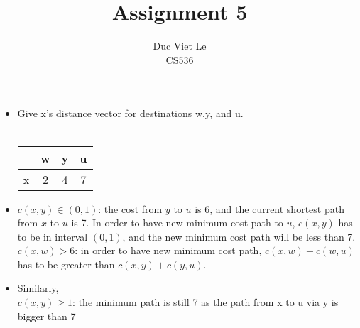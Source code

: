 \documentclass[11pt]{article}
\newenvironment{problem}[2][Problem]{\begin{trivlist}
\item[\hskip \labelsep {\bfseries #1}\hskip \labelsep {\bfseries #2.}]}{\end{trivlist}}
\begin{document}
\title{Assignment 5}
\author{Duc Viet Le\\ CS536}
 
\maketitle

\begin{problem}{1}
\end{problem}

\begin{problem}{2}
\end{problem}
\begin{itemize}
	\item Give x's distance vector for destinations w,y, and u.
	\\\\
	\begin{tabular}{c c c c}
		\hline & w & y & u \\
		\hline x &2 & 4 & 7
	\end{tabular}
	\item 
	$c(x,y) \in (0,1)$: the cost from $y$ to $u$ is 6, and the current shortest path from $x$ to $u$ is 7. In order to have new minimum cost path to $u$, $c(x,y)$ has to be in interval $(0,1)$, and the new minimum cost path will be less than 7.
	\\
	$c(x,w) > 6$: in order to have new minimum cost path, $c(x,w)+c(w,u)$ has to be greater than $c(x,y)+c(y,u)$.
	\item Similarly, \\
	$c(x,y) \geq 1$: the minimum path is still 7 as the path from x to u via y is bigger than 7 \\
	 

\end{itemize}
\end{document}
